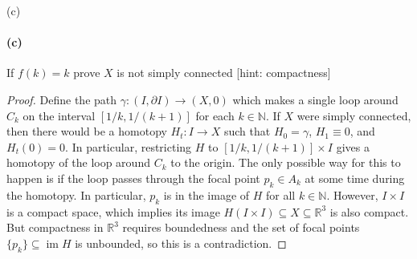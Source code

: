 \documentclass[12pt]{article}
\newlength{\myparskip}
\newenvironment{fullbox}{\begin{lrbox}{\savefullbox}\begin{minipage}{\dimexpr\textwidth-2\fboxsep\relax}\setlength{\parskip}{\myparskip}}{\end{minipage}\end{lrbox}\framebox[\textwidth]{\usebox{\savefullbox}}}
\newenvironment{pbox}[1][]{\begin{fullbox}\ifx#1\empty\else\paragraph{#1}\phantom{}\fi}{\end{fullbox}}
\theoremstyle{definition}
\newcommand{\N}{\mathbb{N}}
\newcommand{\R}{\mathbb{R}}
\newcommand{\<}{\langle}
\renewcommand{\>}{\rangle}
\newcommand{\seq}{\subseteq}
\DeclareMathOperator{\im}{im}
\newcommand{\bd}{\partial}
\begin{document}
\begin{pbox}[(c)]
    If $f(k) = k$ prove $X$ is not simply connected [hint: compactness]
\end{pbox}

\begin{proof}
    Define the path $\gamma : (I, \bd I) \to (X, 0)$ which makes a single loop around $C_k$ on the interval $[1/k, 1/(k+1)]$ for each $k \in \N$.
    If $X$ were simply connected, then there would be a homotopy $H_t : I \to X$ such that $H_0 = \gamma$, $H_1 \equiv 0$, and $H_t(0) = 0$.
    In particular, restricting $H$ to $[1/k, 1/(k+1)] \times I$ gives a homotopy of the loop around $C_k$ to the origin.
    The only possible way for this to happen is if the loop passes through the focal point $p_k \in A_k$ at some time during the homotopy.
    In particular, $p_k$ is in the image of $H$ for all $k \in \N$.
    However, $I \times I$ is a compact space, which implies its image $H(I \times I) \seq X \seq \R^3$ is also compact.
    But compactness in $\R^3$ requires boundedness and the set of focal points $\{p_k\} \seq \im H$ is unbounded, so this is a contradiction.
\end{proof}
\end{document}
